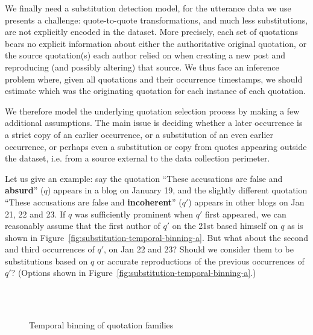 \label{sec:temporal-binning}

We finally need a substitution detection model, for the utterance data we use presents a challenge: quote-to-quote transformations, and much less substitutions, are not explicitly encoded in the dataset. More precisely, each set of quotations bears no explicit information about either the authoritative original quotation, or the source quotation(s) each author relied on when creating a new post and reproducing (and possibly altering) that source.
We thus face an inference problem where, given all quotations and their occurrence timestamps, we should estimate which was the originating quotation for each instance of each quotation.

We therefore model the underlying quotation selection process by making a few additional assumptions.%
The main issue is deciding whether a later occurrence is a strict copy of an earlier occurrence, or a substitution of an even earlier occurrence, or perhaps even a substitution or copy from quotes appearing outside the dataset, \hbox{i.e.} from a source external to the data collection perimeter.

Let us give an example: say the quotation ``These accusations are false and \textbf{absurd}'' ($q$) appears in a blog on January 19, and the slightly different quotation ``These accusations are false and \textbf{incoherent}'' ($q'$) appears in other blogs on Jan 21, 22 and 23.
If $q$ was sufficiently prominent when $q'$ first appeared, we can reasonably assume that the first author of $q'$ on the 21st based himself on $q$ as is shown in Figure~\ref{fig:substitution-temporal-binning-a}.
But what about the second and third occurrences of $q'$, on Jan 22 and 23?
Should we consider them to be substitutions based on $q$ %
or accurate reproductions of the previous occurrences of $q'$? (Options shown in Figure~\ref{fig:substitution-temporal-binning-a}.)

\begin{figure}[h]
    \centering
	\hfill \\
	\hfill \\
	\subfloat[XXXX]{
	    \def\svgwidth{\linewidth}
	    \small
		
	    \label{fig:substitution-q_max}
	}
	\caption{Temporal binning of quotation families}
    \label{fig:substitution-temporal-binning}
\end{figure}

